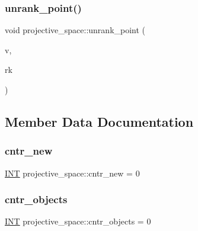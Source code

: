 \mbox{\label{classprojective__space_a3cb7917af4c5f1590b660d4bf907e0fa}} 
\subsubsection{\texorpdfstring{unrank\+\_\+point()}{unrank\_point()}}
{\footnotesize\ttfamily void projective\+\_\+space\+::unrank\+\_\+point (\begin{DoxyParamCaption}\item[{\mbox{\hyperlink{galois_8h_a09fddde158a3a20bd2dcadb609de11dc}{I\+NT}} $\ast$}]{v,  }\item[{\mbox{\hyperlink{galois_8h_a09fddde158a3a20bd2dcadb609de11dc}{I\+NT}}}]{rk }\end{DoxyParamCaption})}



\subsection{Member Data Documentation}
\mbox{\label{classprojective__space_a9aa71c592e2ab69083b38b713e011e3f}} 
\subsubsection{\texorpdfstring{cntr\+\_\+new}{cntr\_new}}
{\footnotesize\ttfamily \mbox{\hyperlink{galois_8h_a09fddde158a3a20bd2dcadb609de11dc}{I\+NT}} projective\+\_\+space\+::cntr\+\_\+new = 0\hspace{0.3cm}{\ttfamily [static]}}

\mbox{\label{classprojective__space_a0cbb7d0c7ac186170c4f51e847c7072c}} 
\subsubsection{\texorpdfstring{cntr\+\_\+objects}{cntr\_objects}}
{\footnotesize\ttfamily \mbox{\hyperlink{galois_8h_a09fddde158a3a20bd2dcadb609de11dc}{I\+NT}} projective\+\_\+space\+::cntr\+\_\+objects = 0\hspace{0.3cm}{\ttfamily [static]}}

